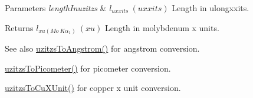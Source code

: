 \begin{DoxyParams}{Parameters}
{\em length\+Inuzitzs} & $ l_{uxxits}\ (uxxits)$ Length in ulongxxits. \\
\hline
\end{DoxyParams}
\begin{DoxyReturn}{Returns}
$ l_{xu(Mo\ K\alpha_1)}\ (xu)$ Length in molybdenum x units. 
\end{DoxyReturn}
\begin{DoxySeeAlso}{See also}
\mbox{\hyperlink{group___e_g_x_math-_conversions-_length_conversions-_non-_s_i-uzitzs-_non-_s_i_gaaaecee65b1db5abcc71e18526e7073eb}{uzitzs\+To\+Angstrom()}} for angstrom conversion. 

\mbox{\hyperlink{group___e_g_x_math-_conversions-_length_conversions-_non-_s_i-uzitzs-_s_i_ga48c60a4876ac426d1717096263648a4d}{uzitzs\+To\+Picometer()}} for picometer conversion. 

\mbox{\hyperlink{group___e_g_x_math-_conversions-_length_conversions-_non-_s_i-uzitzs-_non-_s_i_gab25470e41b88c41d4bf32622baa6c472}{uzitzs\+To\+Cu\+X\+Unit()}} for copper x unit conversion. 
\end{DoxySeeAlso}
